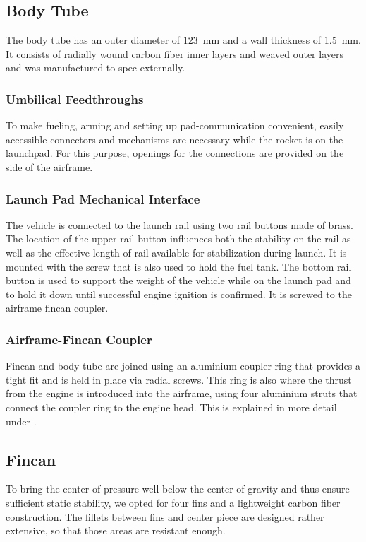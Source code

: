 \subsection{Body Tube}
The body tube has an outer diameter of \SI{123}{\milli\meter} and a wall thickness of \SI{1.5}{\milli\meter}. It consists of radially wound carbon fiber inner layers and weaved outer layers and was manufactured to spec externally.

\subsubsection{Umbilical Feedthroughs}
To make fueling, arming and setting up pad-communication convenient, easily accessible connectors and mechanisms are necessary while the rocket is on the launchpad. For this purpose, openings for the connections are provided on the side of the airframe.

\subsubsection{Launch Pad Mechanical Interface}
The vehicle is connected to the launch rail using two rail buttons made of brass. The location of the upper rail button influences both the stability on the rail as well as the effective length of rail available for stabilization during launch. It is mounted with the screw that is also used to hold the fuel tank. The bottom rail button is used to support the weight of the vehicle while on the launch pad and to hold it down until successful engine ignition is confirmed. It is screwed to the airframe fincan coupler.

\subsubsection{Airframe-Fincan Coupler}\label{sec:aerostructure_lowercoupler}
Fincan and body tube are joined using an aluminium coupler ring that provides a tight fit and is held in place via radial screws. This ring is also where the thrust from the engine is introduced into the airframe, using four aluminium struts that connect the coupler ring to the engine head. This is explained in more detail under .

\subsection{Fincan}
To bring the center of pressure well below the center of gravity and thus ensure sufficient static stability, we opted for four fins and a lightweight carbon fiber construction. The fillets between fins and center piece are designed rather extensive, so that those areas are resistant enough.

